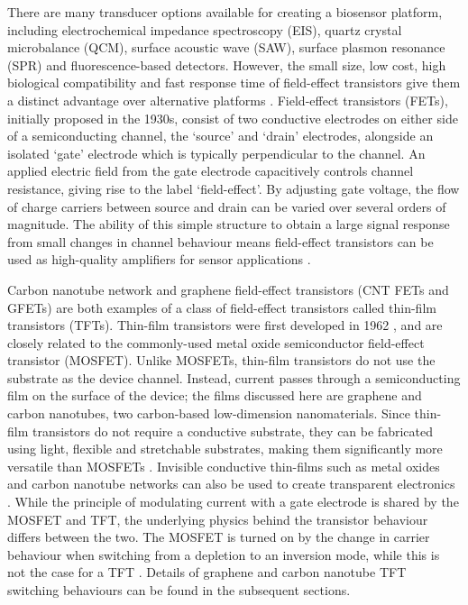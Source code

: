 \documentclass[
  a4paper,
]{scrbook}
\begin{document}
There are many transducer options available for creating a biosensor
platform, including electrochemical impedance spectroscopy (EIS), quartz
crystal microbalance (QCM), surface acoustic wave (SAW), surface plasmon
resonance (SPR) and fluorescence-based detectors. However, the small
size, low cost, high biological compatibility and fast response time of
field-effect transistors give them a distinct advantage over alternative
platforms \autocite{Khan2020,Shkodra2021,Hirata2021}. Field-effect
transistors (FETs), initially proposed in the 1930s, consist of two
conductive electrodes on either side of a semiconducting channel, the
`source' and `drain' electrodes, alongside an isolated `gate' electrode
which is typically perpendicular to the channel. An applied electric
field from the gate electrode capacitively controls channel resistance,
giving rise to the label `field-effect'. By adjusting gate voltage, the
flow of charge carriers between source and drain can be varied over
several orders of magnitude. The ability of this simple structure to
obtain a large signal response from small changes in channel behaviour
means field-effect transistors can be used as high-quality amplifiers
for sensor applications
\autocite{Kauffman2008,Petti2016,Tran2016,Shkodra2021,Yao2021}.

Carbon nanotube network and graphene field-effect transistors (CNT FETs
and GFETs) are both examples of a class of field-effect transistors
called thin-film transistors (TFTs). Thin-film transistors were first
developed in 1962 \autocite{Weimer1962}, and are closely related to the
commonly-used metal oxide semiconductor field-effect transistor
(MOSFET). Unlike MOSFETs, thin-film transistors do not use the substrate
as the device channel. Instead, current passes through a semiconducting
film on the surface of the device; the films discussed here are graphene
and carbon nanotubes, two carbon-based low-dimension nanomaterials.
Since thin-film transistors do not require a conductive substrate, they
can be fabricated using light, flexible and stretchable substrates,
making them significantly more versatile than MOSFETs
\autocite{Kauffman2008,Cao2009,Petti2016,Shkodra2021}. Invisible
conductive thin-films such as metal oxides and carbon nanotube networks
can also be used to create transparent electronics \autocite{Cao2009}.
While the principle of modulating current with a gate electrode is
shared by the MOSFET and TFT, the underlying physics behind the
transistor behaviour differs between the two. The MOSFET is turned on by
the change in carrier behaviour when switching from a depletion to an
inversion mode, while this is not the case for a TFT
\autocite{Petti2016}. Details of graphene and carbon nanotube TFT
switching behaviours can be found in the subsequent sections.
\end{document}

